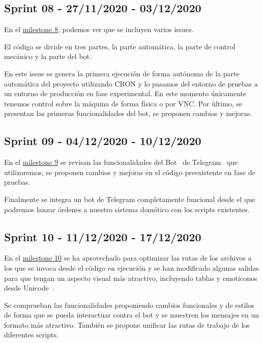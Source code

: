 \subsection{Sprint 08 - 27/11/2020 - 03/12/2020}
En el \href{https://github.com/davidelinformatico/TFG/milestone/8?closed=1}{milestone 8}, podemos ver que se incluyen varios issues.

El código se divide en tres partes, la parte automática, la parte de control mecánico y la parte del bot. 

En este issue se genera la primera ejecución de forma autónoma de la parte automática del proyecto utilizando CRON y lo pasamos del entorno de pruebas a un entorno de producción en fase experimental. En este momento únicamente tenemos control sobre la máquina de forma física o por VNC.
Por último, se presentan las primeras funcionalidades del bot, se proponen cambios y mejoras.

\subsection{Sprint 09 - 04/12/2020 - 10/12/2020}
En el \href{https://github.com/davidelinformatico/TFG/milestone/9?closed=1}{milestone 9} se revisan las funcionalidades del Bot~\cite{misc:TelegramApi} de Telegram~\cite{misc:TelegramApp} que utilizaremos, se proponen cambios y mejoras en el código preexistente en fase de pruebas.

Finalmente se integra un bot de Telegram completamente funcional desde el que podremos lanzar órdenes a nuestro sistema domótico con los scripts existentes.

\subsection{Sprint 10 - 11/12/2020 - 17/12/2020}
En el \href{https://github.com/davidelinformatico/TFG/milestone/10?closed=1}{milestone 10} se ha aprovechado para optimizar las rutas de los archivos a los que se invoca desde el código en ejecución y se han modificado algunas salidas para que tengan un aspecto visual más atractivo, incluyendo tablas y emoticonos desde Unicode~\cite{misc:UnicodeWikipedia}.

Se comprueban las funcionalidades proponiendo cambios funcionales y de estilos de forma que se pueda interactuar contra el bot y se muestren los mensajes en un formato más atractivo. También se propone unificar las rutas de trabajo de los diferentes scripts.




